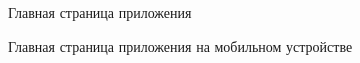 \documentclass[a4paper]{article}
\begin{document}
\begin{figure}[h]
\caption{Главная страница приложения}
\label{fig:image1}
\end{figure}

\begin{figure}[h]
\caption{Главная страница приложения на мобильном устройстве}
\label{fig:image2}
\end{figure}
\end{document}
